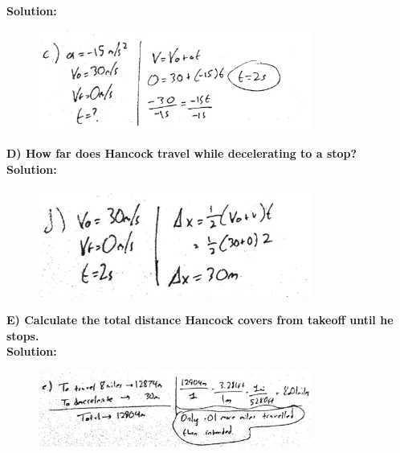 \documentclass[a4paper,12pt]{article}
\begin{document}
\noindent\textbf{Solution:}

\begin{figure}[H]
    \centering
    \includegraphics[width=0.8\textwidth]{U1_P1_C} %
\end{figure}


\noindent\textbf{D) How far does Hancock travel while decelerating to a stop?} \\

\noindent\textbf{Solution:}

\begin{figure}[H]
    \centering
    \includegraphics[width=0.8\textwidth]{U1_P1_D} %
\end{figure}

\newpage

\noindent\textbf{E) Calculate the total distance Hancock covers from takeoff until he stops.} \\

\noindent\textbf{Solution:}

\begin{figure}[H]
    \centering
    \includegraphics[width=0.8\textwidth]{U1_P1_E} %
\end{figure}

\end{document}

